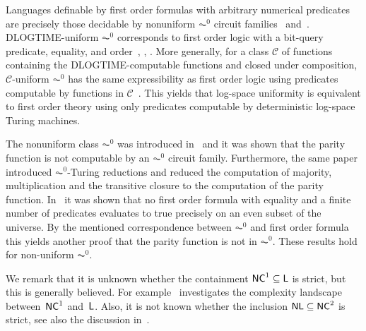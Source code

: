 Languages definable by first order formulas with arbitrary numerical predicates are precisely those decidable
by nonuniform $\AC^0$ circuit families~\cite[Thm. 4]{DBLP:journals/mst/Barrington90}
and~\cite[Thm.~6.2]{DBLP:journals/siamcomp/Immerman87}.
DLOGTIME-uniform $\AC^0$ corresponds to 
first order logic with a bit-query predicate, equality, and order~\cite{BarringtonIS90},
\cite[Thm. 5]{DBLP:journals/mst/Barrington90}, \cite[Thm.~5.22]{DBLP:books/daglib/0095988}.
More generally, for a class $\mathcal C$ 
of functions containing the DLOGTIME-computable functions and closed under composition,
$\mathcal C$-uniform $\AC^0$ has the same expressibility as first
order logic using predicates computable by functions in $\mathcal C$~\cite[Cor. 6]{DBLP:journals/mst/Barrington90}.
This yields that log-space uniformity 
is equivalent to first order theory using only predicates computable by deterministic log-space Turing machines. 

The nonuniform class $\AC^0$ was introduced in~\cite{DBLP:journals/mst/FurstSS84} and it was shown that the parity function
is not computable by an $\AC^0$ circuit family. Furthermore, the same paper introduced $\AC^0$-Turing reductions
and reduced 
the computation of majority, multiplication and the transitive closure to the computation of the parity
function. 
In~\cite{DBLP:journals/apal/Ajtai89} it was shown that no first order formula with equality and
a finite number of predicates evaluates to true precisely on an even subset
of the universe. By the mentioned correspondence between $\AC^0$
and first order formula this yields another proof that the parity function is not in $\AC^0$. 
These results hold for non-uniform $\AC^0$.

We remark that it is unknown whether the containment $\textup{\textsf{NC}}^1 \subseteq \textsf{L}$ is strict,
but this is generally believed. For example~\cite{DBLP:journals/tcs/DattaMRTV12} 
investigates the complexity landscape between~$\textup{\textsf{NC}}^1$ and~$\textsf{L}$.
Also, it is not known whether the inclusion $\textup{\textsf{NL}} \subseteq \textup{\textsf{NC}}^2$ is strict,
see also the discussion in~\cite{DBLP:journals/jcss/Ruzzo81}.

